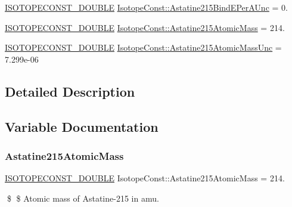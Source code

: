 \begin{DoxyCompactItemize}
\mbox{\hyperlink{group___isotope_const-_macros_ga8f45a7272ce02c0b4c65c44636ed719a}{I\+S\+O\+T\+O\+P\+E\+C\+O\+N\+S\+T\+\_\+\+D\+O\+U\+B\+LE}} \mbox{\hyperlink{group___isotope_const-_astatine-_at215_ga53d4ba3b47b0b7a1ec07cb9290adbc09}{Isotope\+Const\+::\+Astatine215\+Bind\+E\+Per\+A\+Unc}} = 0.
\item 
\mbox{\hyperlink{group___isotope_const-_macros_ga8f45a7272ce02c0b4c65c44636ed719a}{I\+S\+O\+T\+O\+P\+E\+C\+O\+N\+S\+T\+\_\+\+D\+O\+U\+B\+LE}} \mbox{\hyperlink{group___isotope_const-_astatine-_at215_gaa1d0fdf6f885f377991bb8706b6a5568}{Isotope\+Const\+::\+Astatine215\+Atomic\+Mass}} = 214.
\item 
\mbox{\hyperlink{group___isotope_const-_macros_ga8f45a7272ce02c0b4c65c44636ed719a}{I\+S\+O\+T\+O\+P\+E\+C\+O\+N\+S\+T\+\_\+\+D\+O\+U\+B\+LE}} \mbox{\hyperlink{group___isotope_const-_astatine-_at215_gacc1b56c2fd85433716c01627675f3927}{Isotope\+Const\+::\+Astatine215\+Atomic\+Mass\+Unc}} = 7.\+299e-\/06
\end{DoxyCompactItemize}


\subsection{Detailed Description}


\subsection{Variable Documentation}
\mbox{\label{group___isotope_const-_astatine-_at215_gaa1d0fdf6f885f377991bb8706b6a5568}} 
\subsubsection{\texorpdfstring{Astatine215\+Atomic\+Mass}{Astatine215AtomicMass}}
{\footnotesize\ttfamily \mbox{\hyperlink{group___isotope_const-_macros_ga8f45a7272ce02c0b4c65c44636ed719a}{I\+S\+O\+T\+O\+P\+E\+C\+O\+N\+S\+T\+\_\+\+D\+O\+U\+B\+LE}} Isotope\+Const\+::\+Astatine215\+Atomic\+Mass = 214.}

\$ \$ Atomic mass of Astatine-\/215 in amu. \mbox{\label{group___isotope_const-_astatine-_at215_gacc1b56c2fd85433716c01627675f3927}} 
